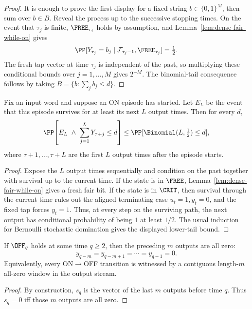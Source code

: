 \begin{proof}
It is enough to prove the first display for a fixed string \(b\in\{0,1\}^M\), then sum over \(b\in B\).
Reveal the process up to the successive stopping times. On the event that \(\tau_j\) is finite, \(\FREE_{\tau_j}\)
holds by assumption, and Lemma~\ref{lem:dense-fair-while-on} gives
\[
\PP[Y_{\tau_j}=b_j\mid \mathcal{F}_{\tau_j-1},\FREE_{\tau_j}]=\tfrac12.
\]
The fresh tap vector at time \(\tau_j\) is independent of the past, so multiplying these conditional bounds over
\(j=1,\dots,M\) gives \(2^{-M}\). The binomial-tail consequence follows by taking
\(B=\{b:\sum_j b_j\le d\}\).
\end{proof}

\begin{lemma}
\label{lem:fixedtap-surviving-episode-tail}
Fix an input word and suppose an ON episode has started. Let \(E_L\) be the event that this episode survives for at
least its next \(L\) output times. Then for every \(d\),
\[
\PP\!\left[
E_L\ \wedge\ \sum_{j=1}^L Y_{\tau+j}\le d
\right]
\le
\PP[\Binomial(L,\tfrac12)\le d],
\]
where \(\tau+1,\dots,\tau+L\) are the first \(L\) output times after the episode starts.
\end{lemma}

\begin{proof}
Expose the \(L\) output times sequentially and condition on the past together with survival up to the current time.
If the state is in \(\FREE\), Lemma~\ref{lem:dense-fair-while-on} gives a fresh fair bit. If the state is in
\(\CRIT\), then survival through the current time rules out the aligned terminating case \(u_t=1,y_t=0\), and the
fixed tap forces \(y_t=1\). Thus, at every step on the surviving path, the next output has conditional probability of
being \(1\) at least \(1/2\). The usual induction for Bernoulli stochastic domination gives the displayed lower-tail
bound.
\end{proof}

\begin{lemma}
\label{lem:dense-off-requires-mzeros}
If $\OFF_q$ holds at some time $q\ge 2$, then the preceding $m$ outputs are all zero:
\[
y_{q-m}=y_{q-m+1}=\cdots=y_{q-1}=0.
\]
Equivalently, every ON$\to$OFF transition is witnessed by a contiguous length-$m$ all-zero window in the output stream.
\end{lemma}

\begin{proof}
By construction, $s_q$ is the vector of the last $m$ outputs before time $q$. Thus $s_q=0$ iff those $m$ outputs are all zero.
\end{proof}

